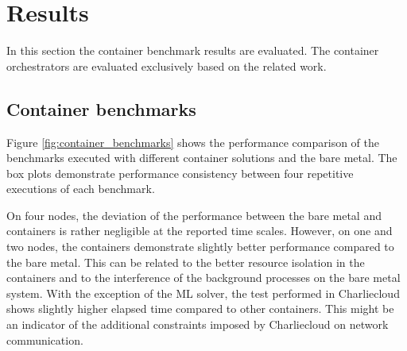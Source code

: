 \documentclass[12pt]{article}
\begin{document}
\section{Results}
In this section the container benchmark results are evaluated. The container orchestrators are evaluated exclusively based on the related work.

\subsection{Container benchmarks}
Figure \ref{fig:container_benchmarks} shows the performance comparison of the benchmarks executed with different container solutions and the bare metal. The box plots demonstrate performance consistency between four repetitive executions of each benchmark.

On four nodes, the deviation of the performance between the bare metal and containers is rather negligible at the reported time scales. However, on one and two nodes, the containers demonstrate slightly better performance compared to the bare metal. This can be related to the better resource isolation in the containers and to the interference of the background processes on the bare metal system. With the exception of the ML solver, the test performed in Charliecloud shows slightly higher elapsed time compared to other containers. This might be an indicator of the additional constraints imposed by Charliecloud on network communication.
\end{document}
